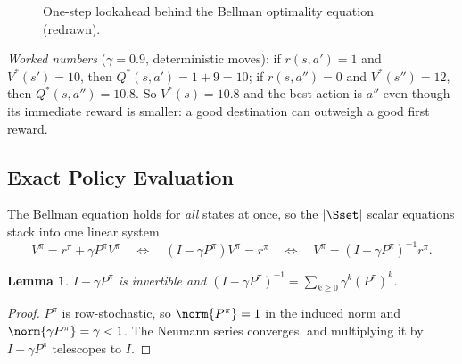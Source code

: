 \documentclass[11pt,a4paper]{article}
\theoremstyle{plain}
\newtheorem{lemma}[theorem]{Lemma}
\theoremstyle{definition}
\theoremstyle{remark}
\begin{document}
\begin{figure}[h]
\centering
{}
\caption{One-step lookahead behind the Bellman optimality equation (redrawn).}
\end{figure}

\begin{intuition}
\emph{Worked numbers} ($\gamma=0.9$, deterministic moves): if $r(s,a')=1$ and $V^*(s')=10$, then $Q^*(s,a')=1+9=10$; if $r(s,a'')=0$ and $V^*(s'')=12$, then $Q^*(s,a'')=10.8$. So $V^*(s)=10.8$ and the best action is $a''$ even though its immediate reward is smaller: a good destination can outweigh a good first reward.
\end{intuition}

\subsection{Exact Policy Evaluation}
The Bellman equation holds for \emph{all} states at once, so the $|\Sset|$ scalar equations stack into one linear system
\[
V^\pi=r^\pi+\gamma P^\pi V^\pi\quad\Longleftrightarrow\quad (I-\gamma P^\pi)V^\pi=r^\pi\quad\Longleftrightarrow\quad V^\pi=(I-\gamma P^\pi)^{-1}r^\pi .
\]

\begin{lemma}\label{lem:inv}
$I-\gamma P^\pi$ is invertible and $(I-\gamma P^\pi)^{-1}=\sum_{k\ge0}\gamma^k(P^\pi)^k$.
\end{lemma}
\begin{proof}
$P^\pi$ is row-stochastic, so $\norm{P^\pi}=1$ in the induced norm and $\norm{\gamma P^\pi}=\gamma<1$. The Neumann series converges, and multiplying it by $I-\gamma P^\pi$ telescopes to $I$.
\end{proof}
\end{document}
